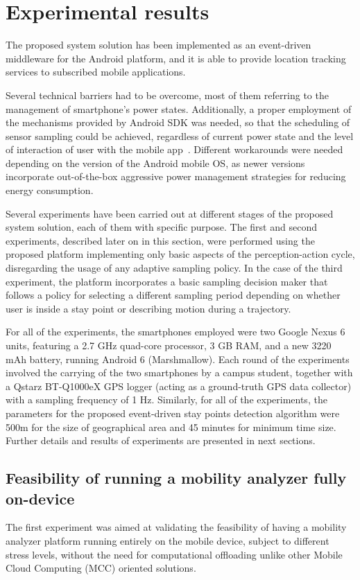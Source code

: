 \documentclass[ENG,PhD]{cinvestav}
\begin{document}
\section{Experimental results}\label{sec:experimental-results}
The proposed system solution has been implemented as an event-driven middleware for the Android platform, and it is able to provide location tracking services to subscribed mobile applications.

Several technical barriers had to be overcome, most of them referring to the management of smartphone's power states.
Additionally, a proper employment of the mechanisms provided by Android SDK was needed, so that the scheduling of sensor sampling could be achieved, regardless of current power state and the level of interaction of user with the mobile app~\cite{Perez-Torres2016b,Android2016b}.
Different workarounds were needed depending on the version of the Android mobile OS, as newer versions incorporate out-of-the-box aggressive power management strategies for reducing energy consumption.

Several experiments have been carried out at different stages of the proposed system solution, each of them with specific purpose.
The first and second experiments, described later on in this section, were performed using the proposed platform implementing only basic aspects of the perception-action cycle, disregarding the usage of any adaptive sampling policy.
In the case of the third experiment, the platform incorporates a basic sampling decision maker that follows a policy for selecting a different sampling period depending on whether user is inside a stay point or describing motion during a trajectory.

For all of the experiments, the smartphones employed were two Google Nexus 6 units, featuring a 2.7 GHz quad-core processor, 3 GB RAM, and a new 3220 mAh battery, running Android 6 (Marshmallow).
Each round of the experiments involved the carrying of the two smartphones by a campus student, together with a Qstarz BT-Q1000eX GPS logger (acting as a ground-truth GPS data collector) with a sampling frequency of 1 Hz.
Similarly, for all of the experiments, the parameters for the proposed event-driven stay points detection algorithm were 500m for the size of geographical area and 45 minutes for minimum time size.
Further details and results of experiments are presented in next sections.


\subsection{Feasibility of running a mobility analyzer fully on-device}
The first experiment was aimed at validating the feasibility of having a mobility analyzer platform running entirely on the mobile device, subject to different stress levels, without the need for computational offloading unlike other Mobile Cloud Computing (MCC) oriented solutions\cite{Perez-Torres2016b}.
\end{document}
